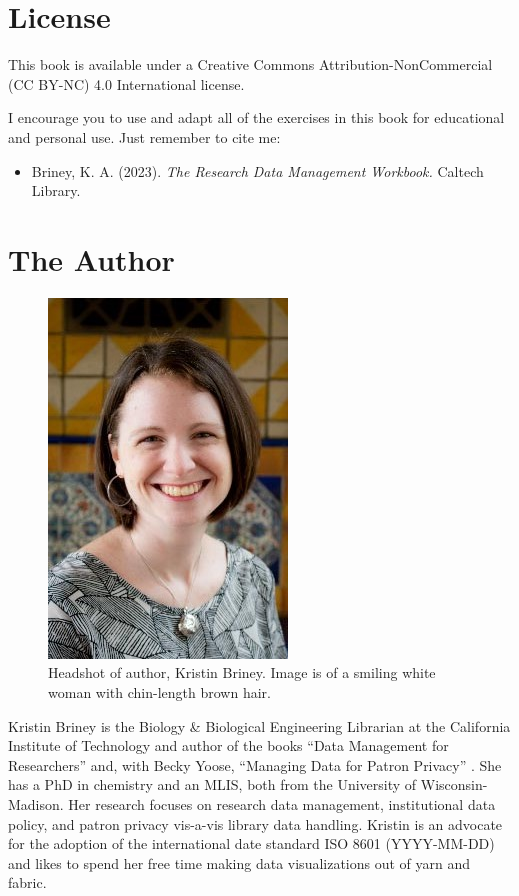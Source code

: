 \documentclass[
]{book}
\providecommand{\tightlist}{%
  \setlength{\itemsep}{0pt}\setlength{\parskip}{0pt}}
\begin{document}
\hypertarget{license}{%
\section*{License}\label{license}}

This book is available under a Creative Commons Attribution-NonCommercial (CC BY-NC) 4.0 International license.

I encourage you to use and adapt all of the exercises in this book for educational and personal use. Just remember to cite me:

\begin{itemize}
\tightlist
\item
  Briney, K. A. (2023). \emph{The Research Data Management Workbook.} Caltech Library.
\end{itemize}

\hypertarget{the-author}{%
\section*{The Author}\label{the-author}}

\begin{figure}
\centering
\includegraphics{images/00_KristinBriney.jpg}
\caption{Headshot of author, Kristin Briney. Image is of a smiling white woman with chin-length brown hair.}
\end{figure}

Kristin Briney is the Biology \& Biological Engineering Librarian at the California Institute of Technology and author of the books ``Data Management for Researchers'' \citep{briney_data_2015} and, with Becky Yoose, ``Managing Data for Patron Privacy'' \citep{briney_managing_2022}. She has a PhD in chemistry and an MLIS, both from the University of Wisconsin-Madison. Her research focuses on research data management, institutional data policy, and patron privacy vis-a-vis library data handling. Kristin is an advocate for the adoption of the international date standard ISO 8601 (YYYY-MM-DD) and likes to spend her free time making data visualizations out of yarn and fabric.
\end{document}
